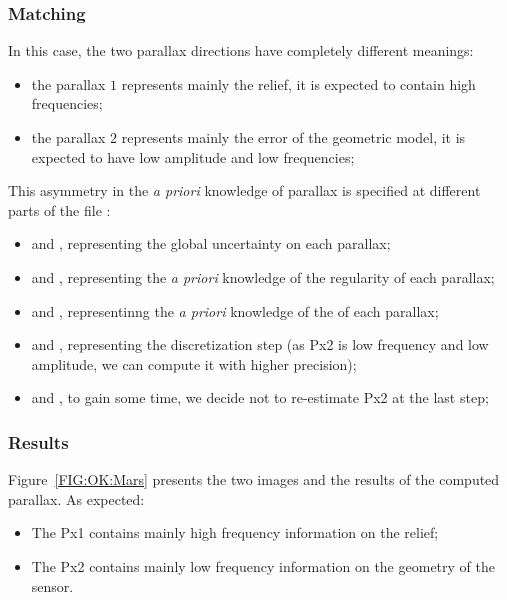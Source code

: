 \subsubsection{Matching}

In this case, the two parallax directions have completely different meanings:

\begin{itemize}
   \item the parallax $1$ represents mainly the relief, it is expected to contain high frequencies;
   \item the parallax $2$ represents mainly the error of the geometric model, it is expected to have
         low amplitude and low frequencies;
\end{itemize}

This asymmetry in the \emph{a priori} knowledge of parallax is specified at different parts of the file :

\begin{itemize}
   \item {\tt <Px1IncCalc>}   and {\tt <Px2IncCalc>},  representing the global uncertainty on each parallax;
   \item {\tt <Px1Regul>}   and {\tt <Px2Regul>},  representing the \emph{a priori} knowledge of the regularity of each
         parallax;
   \item {\tt <Px1PenteMax>}   and {\tt <Px2PenteMax>},  representinng the \emph{a priori} knowledge of the
          of each parallax;
   \item {\tt <Px1Pas>}   and {\tt <Px2Pas>},  representing the discretization step (as Px2 is low frequency and
         low amplitude, we can compute it with higher precision);
   \item {\tt <Px1DilatAlti>}   and {\tt <Px2DilatAlti>}, to gain some time, we decide not to re-estimate Px2 at the last step;
\end{itemize}

\subsubsection{Results}

Figure~\ref{FIG:OK:Mars} presents the two images and the results of the computed parallax.
As expected:

\begin{itemize}
   \item The Px1 contains mainly high frequency information on the relief;
   \item The Px2 contains mainly low frequency information on  the geometry of the sensor.
\end{itemize}


